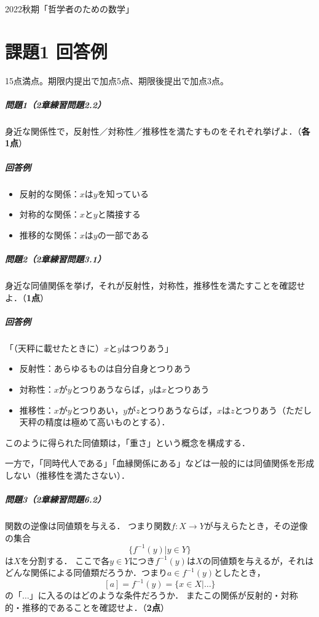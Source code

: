 \documentclass[11pt,a4paper]{jsarticle}
\begin{document}
\noindent
2022秋期「哲学者のための数学」

\section*{課題1 回答例}
15点満点。期限内提出で加点5点、期限後提出で加点3点。

\subparagraph{問題1（2章練習問題2.2）}
身近な関係性で，反射性／対称性／推移性を満たすものをそれぞれ挙げよ．（\textbf{各1点}）

\subparagraph{回答例}
\begin{itemize}
 \item 反射的な関係：$x$は$y$を知っている
 \item 対称的な関係：$x$と$y$と隣接する
 \item 推移的な関係：$x$は$y$の一部である
\end{itemize} 



\subparagraph{問題2（2章練習問題3.1）}
身近な同値関係を挙げ，それが反射性，対称性，推移性を満たすことを確認せよ．（\textbf{1点}）

\subparagraph{回答例}
「（天秤に載せたときに）$x$と$y$はつりあう」
\begin{itemize}
 \item 反射性：あらゆるものは自分自身とつりあう
 \item 対称性：$x$が$y$とつりあうならば，$y$は$x$とつりあう
 \item 推移性：$x$が$y$とつりあい，$y$が$z$とつりあうならば，$x$は$z$とつりあう（ただし天秤の精度は極めて高いものとする）．
\end{itemize}
このように得られた同値類は，「重さ」という概念を構成する．

一方で，「同時代人である」「血縁関係にある」などは一般的には同値関係を形成しない（推移性を満たさない）．


\subparagraph{問題3（2章練習問題6.2）}
関数の逆像は同値類を与える．
つまり関数$f:X \to Y$が与えらたとき，その逆像の集合
\[
 \{f^{-1}(y) | y \in Y\}
\]
は$X$を分割する．
ここで各$y\in Y$につき$f^{-1}(y)$は$X$の同値類を与えるが，それはどんな関係による同値類だろうか．つまり$a \in f^{-1}(y)$としたとき，
\[
 [a] = f^{-1}(y) = \{x \in X |\dots \}
\]
の「$\dots$」に入るのはどのような条件だろうか．
またこの関係が反射的・対称的・推移的であることを確認せよ．（\textbf{2点}）
\end{document}
